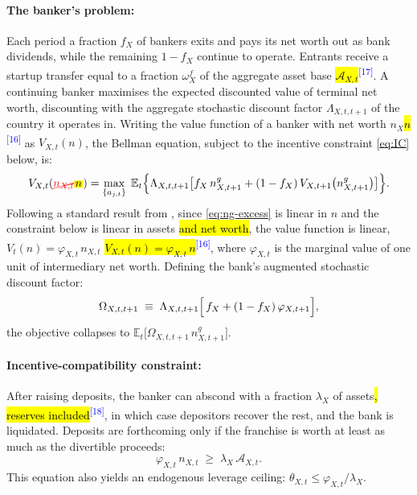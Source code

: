 \documentclass[11pt]{article}
\newcommand{\E}{\mathbb{E}}
\newcommand{\A}[1]{\hl{#1}}
\newcommand{\D}[1]{{\color{red}\st{#1}}}
\newcommand{\Am}[1]{\mathchoice
  {{\setlength{\fboxsep}{1pt}\colorbox{yellow}{$\displaystyle #1$}}}
  {{\setlength{\fboxsep}{1pt}\colorbox{yellow}{$\textstyle #1$}}}
  {{\setlength{\fboxsep}{1pt}\colorbox{yellow}{$\scriptstyle #1$}}}
  {{\setlength{\fboxsep}{1pt}\colorbox{yellow}{$\scriptscriptstyle #1$}}}}
\newcommand{\Dm}[1]{{\color{red}\cancel{#1}}}
\newcommand{\chg}[1]{\textsuperscript{\textcolor{blue}{\scriptsize[#1]}}}
\begin{document}
\paragraph{The banker's problem:} Each period a fraction $f_X$ of bankers exits and pays its net worth out as bank dividends, while the remaining $1-f_X$ continue to operate. Entrants receive a startup transfer equal to a fraction $\omega_X^f$ of the aggregate asset base \A{$\mathcal{A}_{X,t}$}\chg{17}. A continuing banker maximises the expected discounted value of terminal net worth, discounting with the aggregate stochastic discount factor $\Lambda_{X,t,t+1}$ of the country it operates in. Writing the value function of a banker with net worth \D{$n_X$}\A{$n$}\chg{16} as $V_{X,t}(n)$, the Bellman equation, subject to the incentive constraint \eqref{eq:IC} below, is:
\begin{equation}
V_{X,t}(\Dm{n_{X,t}}\Am{n})
=\max_{\{a_{j,t}\}}\;
\E_t\Bigl\{\Lambda_{X,t,t+1}\bigl[
   f_X\,n^{g}_{X,t+1}+(1-f_X)\,V_{X,t+1}\bigl(n^{g}_{X,t+1}\bigr)\bigr]\Bigr\}.
\label{eq:bank-bellman}
\end{equation}
Following a standard result from \cite{gertler2011model}, since \eqref{eq:ng-excess} is linear in $n$ and the constraint below is linear in assets \A{and net worth}, the value function is linear, \D{$V_t(n)=\varphi_{X,t}\,n_{X,t}$} \A{$V_{X,t}(n)=\varphi_{X,t}\,n$}\chg{16}, where $\varphi_{X,t}$ is the marginal value of one unit of intermediary net worth. Defining the bank's augmented stochastic discount factor:
\begin{equation}
\Omega_{X,t,t+1}\;\equiv\;\Lambda_{X,t,t+1}\Bigl[\,f_X+(1-f_X)\,\varphi_{X,t+1}\Bigr],
\label{eq:omega}
\end{equation}
the objective collapses to $\E_t\bigl[\Omega_{X,t,t+1}\,n^{g}_{X,t+1}\bigr]$.

\paragraph{Incentive-compatibility constraint:} After raising deposits, the banker can abscond with a fraction $\lambda_X$ of assets\A{, reserves included}\chg{18}, in which case depositors recover the rest, and the bank is liquidated. Deposits are forthcoming only if the franchise is worth at least as much as the divertible proceeds:
\begin{equation}
\varphi_{X,t}\,n_{X,t}\;\ge\;\lambda_X\,\mathcal{A}_{X,t}.
\label{eq:IC}
\end{equation}
This equation also yields an endogenous leverage ceiling: $\theta_{X,t}\le\varphi_{X,t}/\lambda_X$.
\end{document}
